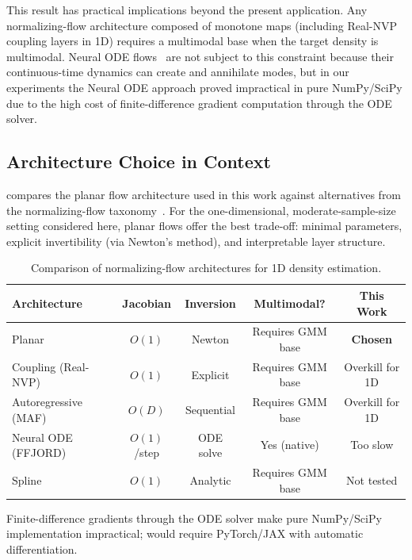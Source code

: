 This result has practical implications beyond the present application.
Any normalizing-flow architecture composed of monotone maps (including Real-NVP~\cite{Dinh2017} coupling layers in 1D) requires a multimodal base when the target density is multimodal.
Neural ODE flows~\cite{Chen2018,Grathwohl2019} are not subject to this constraint because their continuous-time dynamics can create and annihilate modes, but in our experiments the Neural ODE approach proved impractical in pure NumPy/SciPy due to the high cost of finite-difference gradient computation through the ODE solver.

\subsection{Architecture Choice in Context}
\label{sec:architecture_context}

 compares the planar flow architecture used in this work against alternatives from the normalizing-flow taxonomy~\cite{Kobyzev2021}.
For the one-dimensional, moderate-sample-size setting considered here, planar flows offer the best trade-off: minimal parameters, explicit invertibility (via Newton's method), and interpretable layer structure.

\begin{table}[htbp]
    \centering
    \begin{threeparttable}
        \caption{Comparison of normalizing-flow architectures for 1D density estimation.}
        \label{tab:architecture_comparison}
        \begin{tabular}{l c c c c}
            \toprule
            \textbf{Architecture} & \textbf{Jacobian} & \textbf{Inversion} & \textbf{Multimodal?} & \textbf{This Work} \\
            \midrule
            Planar~\cite{Rezende2015} & $O(1)$ & Newton & Requires GMM base & \textbf{Chosen} \\
            Coupling (Real-NVP)~\cite{Dinh2017} & $O(1)$ & Explicit & Requires GMM base & Overkill for 1D \\
            Autoregressive (MAF)~\cite{Papamakarios2021} & $O(D)$ & Sequential & Requires GMM base & Overkill for 1D \\
            Neural ODE (FFJORD)~\cite{Grathwohl2019} & $O(1)$/step & ODE solve & Yes (native) & Too slow\tnote{a} \\
            Spline~\cite{Kobyzev2021} & $O(1)$ & Analytic & Requires GMM base & Not tested \\
            \bottomrule
        \end{tabular}
        \begin{tablenotes}
            \small
            \item[a] Finite-difference gradients through the ODE solver make pure NumPy/SciPy implementation impractical; would require PyTorch/JAX with automatic differentiation.
        \end{tablenotes}
    \end{threeparttable}
\end{table}

